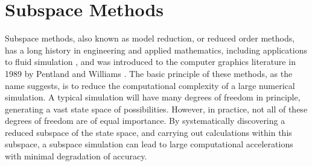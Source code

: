 \section{Subspace Methods}
Subspace methods, also known as model reduction, or reduced order methods, has a long history in engineering and applied mathematics, including applications to fluid simulation \cite{lumley1967}, and was introduced to the computer graphics literature in 1989 by Pentland and Williams \cite{Pentland:1989:GVM, Berkooz93theproper}. The basic principle of these methods, as the name suggests, is to reduce the computational complexity of a large numerical simulation. A typical simulation will have many degrees of freedom in principle, generating a vast state space of possibilities. However, in practice, not all of these degrees of freedom are of equal importance. By systematically discovering a reduced subspace of the state space, and carrying out calculations within this subspace, a subspace simulation can lead to large computational accelerations with minimal degradation of accuracy.

